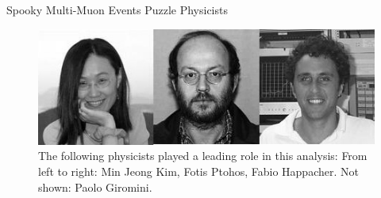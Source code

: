 \begin{multimuons-2}[enhanced, tikz={rotate=0}]{Spooky Multi-Muon Events Puzzle Physicists}
\begin{multicols}{3}
  \end{multicols}
    \begin{figure}
      \begin{center}
        \vspace{-0.2in}
        \leavevmode
        \includegraphics[width=1.0\textwidth]{./figures/Fotios-MinJeongKimBW.jpg}
        \caption*{The following physicists played a leading role in this analysis: From
          left to right: Min Jeong Kim, Fotis Ptohos, Fabio Happacher. Not shown: Paolo Giromini.}
      \end{center}
    \end{figure}
  
\end{multimuons-2}
